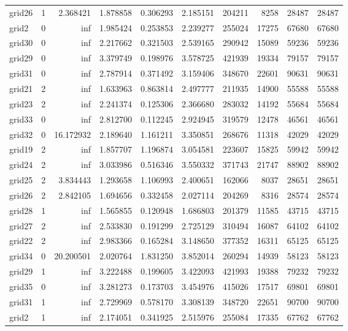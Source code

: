 \documentclass[../../../thesis.tex]{subfiles}
\begin{document}
\begin{longtable}{|l|r|r|r|r|r|r|r|r|r|}
grid26 & 1 & 2.368421 & 1.878858 & 0.306293 & 2.185151 & 204211 & 8258 & 28487 & 28487 \\
grid2 & 0 & inf & 1.985424 & 0.253853 & 2.239277 & 255024 & 17275 & 67680 & 67680 \\
grid30 & 0 & inf & 2.217662 & 0.321503 & 2.539165 & 290942 & 15089 & 59236 & 59236 \\
grid29 & 0 & inf & 3.379749 & 0.198976 & 3.578725 & 421939 & 19334 & 79157 & 79157 \\
grid31 & 0 & inf & 2.787914 & 0.371492 & 3.159406 & 348670 & 22601 & 90631 & 90631 \\
grid21 & 2 & inf & 1.633963 & 0.863814 & 2.497777 & 211935 & 14900 & 55588 & 55588 \\
grid23 & 2 & inf & 2.241374 & 0.125306 & 2.366680 & 283032 & 14192 & 55684 & 55684 \\
grid33 & 0 & inf & 2.812700 & 0.112245 & 2.924945 & 319579 & 12478 & 46561 & 46561 \\
grid32 & 0 & 16.172932 & 2.189640 & 1.161211 & 3.350851 & 268676 & 11318 & 42029 & 42029 \\
grid19 & 2 & inf & 1.857707 & 1.196874 & 3.054581 & 223607 & 15825 & 59942 & 59942 \\
grid24 & 2 & inf & 3.033986 & 0.516346 & 3.550332 & 371743 & 21747 & 88902 & 88902 \\
grid25 & 2 & 3.834443 & 1.293658 & 1.106993 & 2.400651 & 162066 & 8037 & 28651 & 28651 \\
grid26 & 2 & 2.842105 & 1.694656 & 0.332458 & 2.027114 & 204269 & 8316 & 28574 & 28574 \\
grid28 & 1 & inf & 1.565855 & 0.120948 & 1.686803 & 201379 & 11585 & 43715 & 43715 \\
grid27 & 2 & inf & 2.533830 & 0.191299 & 2.725129 & 310494 & 16087 & 64102 & 64102 \\
grid22 & 2 & inf & 2.983366 & 0.165284 & 3.148650 & 377352 & 16311 & 65125 & 65125 \\
grid34 & 0 & 20.200501 & 2.020764 & 1.831250 & 3.852014 & 260294 & 14939 & 58123 & 58123 \\
grid29 & 1 & inf & 3.222488 & 0.199605 & 3.422093 & 421993 & 19388 & 79232 & 79232 \\
grid35 & 0 & inf & 3.281273 & 0.173703 & 3.454976 & 415026 & 17517 & 69801 & 69801 \\
grid31 & 1 & inf & 2.729969 & 0.578170 & 3.308139 & 348720 & 22651 & 90700 & 90700 \\
grid2 & 1 & inf & 2.174051 & 0.341925 & 2.515976 & 255084 & 17335 & 67762 & 67762 \\

\end{longtable}
\end{document}
